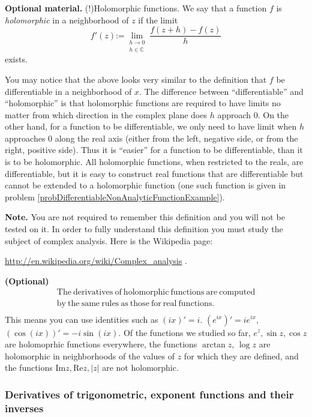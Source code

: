 \documentclass[12pt]{book}
\renewcommand{\Im}{\mathrm{Im}}
\renewcommand{\Re}{\mathrm{Re}}
\newcommand{\eqdef}{\textbf{:=}}
\newcommand{\optionalMaterial}{\textbf{(Optional)}}
\begin{document}
\textbf{Optional material.} (!)Holomorphic functions. We say that a function $f$ is \emph{holomorphic} in a neighborhood of  $z$ if the limit 
\[
f'(z)\eqdef \lim_{\substack{h\to 0\\ h\in \mathbb C}} \frac{ f(z+h)-f(z)}{h}
\]
exists.

You may notice that the above looks very similar to the definition that $f$ be differentiable in a neighborhood of $x$. The difference between ``differentiable'' and ``holomorphic'' is that holomorphic functions are required to have limits no matter from which direction in the complex plane does $h$ approach $0$. On the other hand, for a function to be differentiable, we only need to have limit when $h$ approaches $0$ along the real axis (either from the left, negative side, or from the right, positive side). Thus it is ``easier'' for a function to be differentiable, than it is to be holomorphic. All holomorphic functions, when restricted to the reals, are differentiable, but it is easy to construct real functions that are differentiable but cannot be extended to a holomorphic function (one such function is given in problem \ref{probDifferentiableNonAnalyticFunctionExample}).

\textbf{Note.} You are not required to remember this definition and you will not be tested on it. In order to fully understand this definition you must study the subject of complex analysis. Here is the Wikipedia page:

\url{http://en.wikipedia.org/wiki/Complex_analysis} \quad .

\optionalMaterial
\[\begin{array}{l}
\mathrm{The~derivatives~of~holomorphic~functions~are~computed} \\
\mathrm{by~the~same~rules~as~those~for~real~functions.} \\
\end{array}
\]
This means you can use identities such as $(ix)'=i$. $(e^{ix})'=ie^{ix}$, $(\cos (ix))'= -i\sin(ix)$. Of the functions we studied so far, $e^z, \sin z, \cos z$ are holomoprhic functions everywhere, the functions $\arctan z$, $\log z$ are holomorphic in neighborhoods of the values of $z$ for which they are defined, and the functions $\Im z, \Re z, |z|$ are not holomorphic.



\subsubsection{Derivatives of trigonometric, exponent functions and their inverses}
\end{document}
